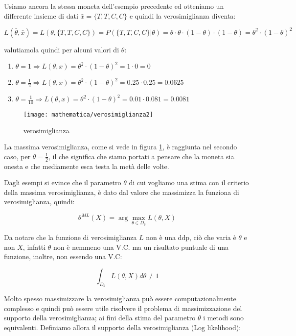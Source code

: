 \begin{esempio} %
Usiamo ancora la stessa moneta dell'esempio precedente ed otteniamo un differente insieme di dati $\bar{x}=\{T,T,C,C\}$ e quindi la verosimiglianza diventa:

    \[ L(\bar{\theta},\bar{x})=L(\theta,\{T,T,C,C\})=P(\{T,T,C,C\}|\theta)=\theta \cdot \theta \cdot (1-\theta) \cdot (1-\theta) = \theta^2 \cdot (1-\theta)^2 \]

valutiamola quindi per alcuni valori di $\theta$:

\begin{enumerate}
  \item $\theta=1  \Rightarrow L(\theta,x)=\theta^2 \cdot (1-\theta)^2=1 \cdot 0=0$
  \item $\theta=\frac{1}{2}  \Rightarrow L(\theta,x)=\theta^2 \cdot (1-\theta)^2=0.25 \cdot 0.25=0.0625$
  \item $\theta=\frac{1}{10}  \Rightarrow L(\theta,x)=\theta^2 \cdot (1-\theta)^2=0.01 \cdot 0.081=0.0081$
\end{enumerate}

  \begin{figure}[htbp]
    \centering
    \texttt{[image: mathematica/verosimiglianza2]} 
    \caption{verosimiglianza\label{fig:verosim2}}
  \end{figure}
La massima verosimiglianza, come si vede in figura \ref{fig:verosim2}, è raggiunta nel secondo caso, per $\theta=\frac{1}{2}$, il che significa che siamo portati a pensare che la moneta sia onesta e che mediamente esca testa la metà delle volte.
\end{esempio}

Dagli esempi si evince che il parametro $\theta$ di cui vogliamo una stima con il criterio della massima verosimiglianza, è dato dal valore che massimizza la funziona di verosimiglianza, quindi:

    \[ \theta^{ML}(X)=\arg \max_{\theta \in D_\theta} L(\theta,X) \]

Da notare che la funzione di verosimiglianza $L$ non è una ddp, ciò che varia è $\theta$ e non $X$, infatti $\theta$ non è nemmeno una V.C. ma un risultato puntuale di una funzione, inoltre, non essendo una V.C:

  \[ \int_{D_\theta}^{}L(\theta,X) d\theta\ne 1 \]
  
Molto spesso massimizzare la verosimiglianza può essere computazionalmente complesso e quindi può essere utile risolvere il problema di massimizzazione del supporto della verosimiglianza; ai fini della stima del parametro $\theta$ i metodi sono equivalenti. Definiamo allora il supporto della verosimiglianza (Log likelihood):

